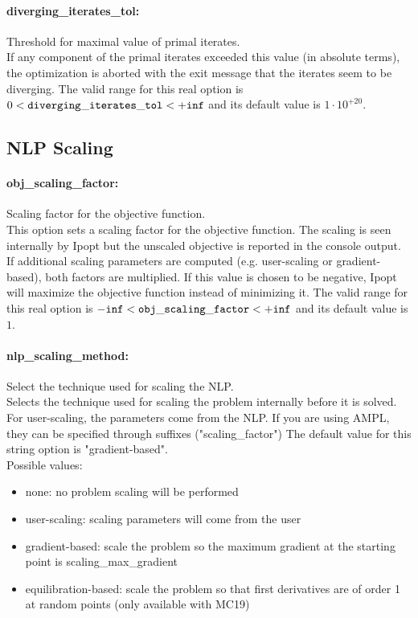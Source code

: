 \paragraph{diverging\_iterates\_tol:}\label{opt:diverging_iterates_tol} Threshold for maximal value of primal iterates. \\
 If any component of the primal iterates exceeded this value (in absolute terms), the optimization is aborted with the exit message that the iterates seem to be diverging. The valid range for this real option is 
$0 <  {\tt diverging\_iterates\_tol } <  {\tt +inf}$
and its default value is $1 \cdot 10^{+20}$.


\subsection{NLP Scaling}

\paragraph{obj\_scaling\_factor:}\label{opt:obj_scaling_factor} Scaling factor for the objective function. \\
 This option sets a scaling factor for the objective function. The scaling is seen internally by Ipopt but the unscaled objective is reported in the console output. If additional scaling parameters are computed (e.g. user-scaling or gradient-based), both factors are multiplied. If this value is chosen to be negative, Ipopt will maximize the objective function instead of minimizing it. The valid range for this real option is 
${\tt -inf} <  {\tt obj\_scaling\_factor } <  {\tt +inf}$
and its default value is $1$.


\paragraph{nlp\_scaling\_method:}\label{opt:nlp_scaling_method} Select the technique used for scaling the NLP. \\
 Selects the technique used for scaling the problem internally before it is solved. For user-scaling, the parameters come from the NLP. If you are using AMPL, they can be specified through suffixes ("scaling\_factor") The default value for this string option is "gradient-based".
\\ 
Possible values:
\begin{itemize}
   \item none: no problem scaling will be performed
   \item user-scaling: scaling parameters will come from the user
   \item gradient-based: scale the problem so the maximum gradient at the starting point is scaling\_max\_gradient
   \item equilibration-based: scale the problem so that first derivatives are of order 1 at random points (only available with MC19)
\end{itemize}


